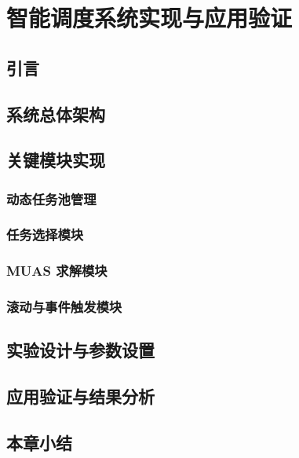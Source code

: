 \chapter{智能调度系统实现与应用验证}

\section{引言}

\section{系统总体架构}

\section{关键模块实现}
\subsection{动态任务池管理}
\subsection{任务选择模块}
\subsection{MUAS 求解模块}
\subsection{滚动与事件触发模块}

\section{实验设计与参数设置}

\section{应用验证与结果分析}

\section{本章小结}
